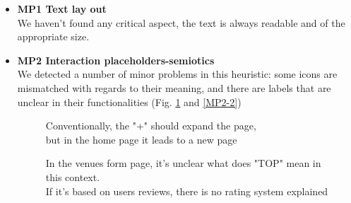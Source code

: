 \begin{itemize}
    \item \textbf{MP1 Text lay out}\\
        We haven't found any critical aspect, the text is always readable and of the appropriate size.\\
    \item \textbf{MP2 Interaction placeholders-semiotics}\\
        We detected a number of minor problems in this heuristic: some icons are mismatched with regards to their meaning, and there are labels that are unclear in their functionalities (Fig. \ref{MP2-1} and \ref{MP2-2})
        \begin{figure}[!ht]
            \begin{minipage}{\linewidth}
                \centering
                \captionsetup{justification=centering}
                \caption{Conventionally, the "+" should expand the page,\\
                but in the home page it leads to a new page}
                \label{MP2-1}
            \end{minipage}
        \end{figure}
        \begin{figure}[!ht]
            \begin{minipage}{\linewidth}
                \centering
                \captionsetup{justification=centering}
                \caption{In the venues form page, it's unclear what does "TOP" mean in this context.\\If it's based on users reviews, there is no rating system explained}

\end{minipage}
\end{figure}
\end{itemize}
